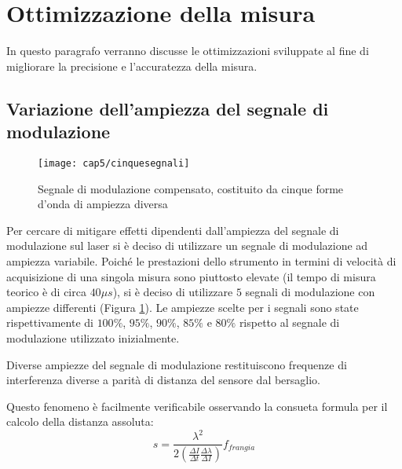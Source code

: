 \section{Ottimizzazione della misura}
In questo paragrafo verranno discusse le ottimizzazioni sviluppate al fine di migliorare la precisione e l'accuratezza della misura.

\subsection{Variazione dell'ampiezza del segnale di modulazione}
\begin{figure}[H]
  \begin{center}
    \texttt{[image: cap5/cinquesegnali]}
    \caption{Segnale di modulazione compensato, costituito da cinque forme d'onda di ampiezza diversa}
    \label{cinquesegnali}
  \end{center}
\end{figure}

Per cercare di mitigare effetti dipendenti dall'ampiezza del segnale di modulazione sul laser si è deciso di utilizzare un segnale di modulazione ad ampiezza variabile. Poiché le prestazioni dello strumento in termini di velocità di acquisizione di una singola misura sono piuttosto elevate (il tempo di misura teorico è di circa $40 \mu s$), si è deciso di utilizzare $5$ segnali di modulazione con ampiezze differenti (Figura \ref{cinquesegnali}). Le ampiezze scelte per i segnali sono state rispettivamente di $100\%$, $95\%$, $90\%$, $85\%$ e $80\%$ rispetto al segnale di modulazione utilizzato inizialmente.	

Diverse ampiezze del segnale di modulazione restituiscono frequenze di interferenza diverse a parità di distanza del sensore dal bersaglio.

Questo fenomeno è facilmente verificabile osservando la consueta formula per il calcolo della distanza assoluta:
\begin{equation}
	s = \frac{\lambda^2}{2\left ( \frac{\Delta I}{\Delta t} \frac{\Delta \lambda}{\Delta I} \right )}  f_{frangia} 
\end{equation}

